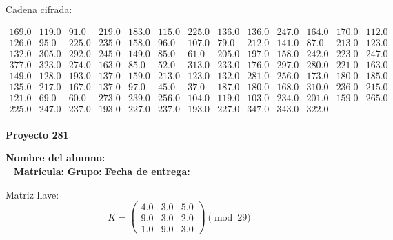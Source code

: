 \documentclass[12pt]{article}
\begin{document}
Cadena cifrada:
\begin{center}
$\begin{array}{lllllllllllll}
169.0 & 119.0 & 91.0 & 219.0 & 183.0 & 115.0 & 225.0 & 136.0 & 136.0 & 247.0 & 164.0 & 170.0 & 112.0\\
126.0 & 95.0 & 225.0 & 235.0 & 158.0 & 96.0 & 107.0 & 79.0 & 212.0 & 141.0 & 87.0 & 213.0 & 123.0\\
132.0 & 305.0 & 292.0 & 245.0 & 149.0 & 85.0 & 61.0 & 205.0 & 197.0 & 158.0 & 242.0 & 223.0 & 247.0\\
377.0 & 323.0 & 274.0 & 163.0 & 85.0 & 52.0 & 313.0 & 233.0 & 176.0 & 297.0 & 280.0 & 221.0 & 163.0\\
149.0 & 128.0 & 193.0 & 137.0 & 159.0 & 213.0 & 123.0 & 132.0 & 281.0 & 256.0 & 173.0 & 180.0 & 185.0\\
135.0 & 217.0 & 167.0 & 137.0 & 97.0 & 45.0 & 37.0 & 187.0 & 180.0 & 168.0 & 310.0 & 236.0 & 215.0\\
121.0 & 69.0 & 60.0 & 273.0 & 239.0 & 256.0 & 104.0 & 119.0 & 103.0 & 234.0 & 201.0 & 159.0 & 265.0\\
225.0 & 247.0 & 237.0 & 193.0 & 227.0 & 237.0 & 193.0 & 227.0 & 347.0 & 343.0 & 322.0\\
\end{array}$
\end{center}

\newpage


\textbf{Proyecto 281}

\textbf{Nombre del alumno:} \underline{\hspace{13cm}}\\\
\vspace{1cm}
\textbf{Matrícula:} \underline{\hspace{4cm}} \hspace{1cm}
\textbf{Grupo:} \underline{\hspace{2cm}}
\textbf{Fecha de entrega:} \underline{\hspace{2cm}}

\medskip

Matriz llave:
\[
K = \begin{pmatrix}
4.0 & 3.0 & 5.0\\
9.0 & 3.0 & 2.0\\
1.0 & 9.0 & 3.0
\end{pmatrix} \pmod{29}
\]
\end{document}
